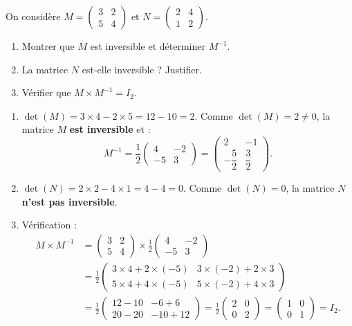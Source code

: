 \documentclass[11pt]{article}
\begin{document}
\begin{exoresolu}
On considère $M=\begin{pmatrix} 3 & 2 \\ 5 & 4 \end{pmatrix}$ et $N=\begin{pmatrix} 2 & 4 \\ 1 & 2 \end{pmatrix}$.
\begin{enumerate}
\item Montrer que $M$ est inversible et déterminer $M^{-1}$.
\item La matrice $N$ est-elle inversible ? Justifier.
\item Vérifier que $M\times M^{-1}=I_2$.
\end{enumerate}
\tcblower
\begin{enumerate}
\item $\det(M)=3\times 4-2\times 5=12-10=2$. Comme $\det(M)=2\neq 0$, la matrice $M$ \textbf{est inversible} et :
\[ M^{-1}=\frac{1}{2}\begin{pmatrix} 4 & -2 \\ -5 & 3 \end{pmatrix}=\begin{pmatrix} 2 & -1 \\ -\dfrac{5}{2} & \dfrac{3}{2} \end{pmatrix}. \]
\item $\det(N)=2\times 2-4\times 1=4-4=0$. Comme $\det(N)=0$, la matrice $N$ \textbf{n'est pas inversible}.
\item Vérification :
\begin{align*}
M\times M^{-1}&=\begin{pmatrix} 3 & 2 \\ 5 & 4 \end{pmatrix}\times\frac{1}{2}\begin{pmatrix} 4 & -2 \\ -5 & 3 \end{pmatrix}\\
&=\frac{1}{2}\begin{pmatrix} 3\times 4+2\times(-5) & 3\times(-2)+2\times 3 \\ 5\times 4+4\times(-5) & 5\times(-2)+4\times 3 \end{pmatrix}\\
&=\frac{1}{2}\begin{pmatrix} 12-10 & -6+6 \\ 20-20 & -10+12 \end{pmatrix}=\frac{1}{2}\begin{pmatrix} 2 & 0 \\ 0 & 2 \end{pmatrix}=\begin{pmatrix} 1 & 0 \\ 0 & 1 \end{pmatrix}=I_2.

\end{align*}
\end{enumerate}
\end{exoresolu}
\end{document}
